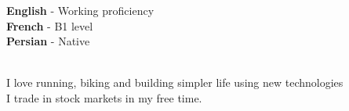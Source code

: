 \documentclass[9pt]{developercv}
\begin{document}

\begin{minipage}[t]{0.45\textwidth}
	\vspace{-\baselineskip} %


	\textbf{English} - Working proficiency\\
	\textbf{French} - B1 level\\
	\textbf{Persian} - Native\\\
\end{minipage}
\hfill
\begin{minipage}[t]{0.45\textwidth}
	\vspace{-\baselineskip} %


	I love running, biking and building simpler life using new technologies\\
	I trade in stock markets in my free time.
\end{minipage}
\end{document}
